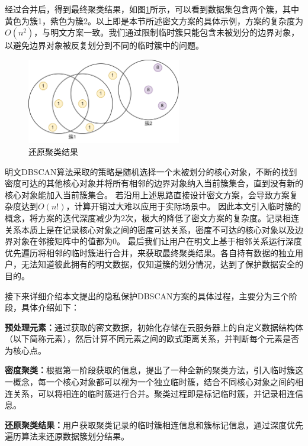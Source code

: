 经过合并后，得到最终聚类结果，如图\ref{dbres}所示，可以看到数据集包含两个簇，其中黄色为簇1，紫色为簇2。以上即是本节所述密文方案的具体示例，方案的复杂度为$ O(n^2) $，与明文方案一致。我们通过限制临时簇只能包含未被划分的边界对象，以避免边界对象被反复划分到不同的临时簇中的问题。

\begin{figure}[htbp]
	\centering
	\includegraphics[width=0.6\textwidth]{img/dbres.png}
	\caption{还原聚类结果}
	\label{dbres}
\end{figure}


明文DBSCAN算法采取的策略是随机选择一个未被划分的核心对象，不断的找到密度可达的其他核心对象并将所有相邻的边界对象纳入当前簇集合，直到没有新的核心对象能加入当前簇集合。
若沿用上述思路直接设计密文方案，会导致方案复杂度达到$ O(n!) $，计算开销过大难以应用于实际场景中。
因此本文引入临时簇的概念，将方案的迭代深度减少为2次，极大的降低了密文方案的复杂度。记录相连关系本质上是在记录核心对象之间的密度可达关系，密度不可达的核心对象以及边界对象在邻接矩阵中的值都为0。
最后我们让用户在明文上基于相邻关系运行深度优先遍历将相邻的临时簇进行合并，来获取最终聚类结果。各自持有数据的独立用户，无法知道彼此拥有的明文数据，仅知道簇的划分情况，达到了保护数据安全的目的。

接下来详细介绍本文提出的隐私保护DBSCAN方案的具体过程，主要分为三个阶段，具体介绍如下：
\begin{compactitem}
	\item \textbf{预处理元素：}通过获取的密文数据，初始化存储在云服务器上的自定义数据结构体（以下简称元素），然后计算不同元素之间的欧式距离关系，并判断每个元素是否为核心点。
	\item \textbf{密度聚类：}根据第一阶段获取的信息，提出了一种全新的聚类方法，引入临时簇这一概念，每一个核心对象都可以视为一个独立临时簇，结合不同核心对象之间的相连关系，可以将相连的临时簇进行合并。聚类过程即是标记临时簇，并记录相连信息。
	\item \textbf{还原聚类结果：}用户获取聚类记录的临时簇相连信息和簇标记信息，通过深度优先遍历算法来还原数据簇划分结果。
\end{compactitem}

